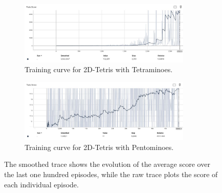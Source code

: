 \begin{figure}
    \centering
    \begin{subfigure}{0.45\textwidth}
        \centering
        \includegraphics[width=0.90\textwidth]{media/2D_tetramino_training.jpeg}
        \caption{Training curve for 2D-Tetris with Tetraminoes.}
        \label{fig:train4block}
    \end{subfigure}

    \begin{subfigure}{0.45\textwidth}
    \centering
    \includegraphics[width=0.90\textwidth]{media/2D_pentamino_training.jpeg}
    \caption{Training curve for 2D-Tetris with Pentominoes.}
    \label{fig:train5block}
    \end{subfigure}

    \caption{The smoothed trace shows the evolution of the average score over the last one hundred episodes, while the raw trace plots the score of each individual episode.}
    \label{fig:2d_training_curves}
\end{figure}
